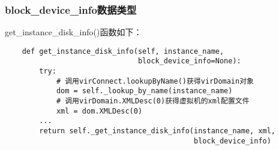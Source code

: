 \documentclass[a4paper,left=1.5cm,right=1.5cm,11pt]{article}
\begin{document}
\subsubsection{block\_device\_info数据类型}

	get\_instance\_disk\_info()函数如下：
	\begin{lstlisting}
	def get_instance_disk_info(self, instance_name,
                               block_device_info=None):
        try:
			# 调用virConnect.lookupByName()获得virDomain对象
            dom = self._lookup_by_name(instance_name)
			# 调用virDomain.XMLDesc(0)获得虚拟机的xml配置文件
            xml = dom.XMLDesc(0)
        ...
        return self._get_instance_disk_info(instance_name, xml,
                                            block_device_info)
	\end{lstlisting}
\end{document}
